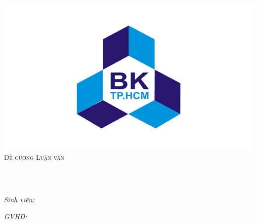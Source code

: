 \documentclass[
11pt, %
vietnam, %
singlespacing, %
parskip, %
headsepline, %
]{MastersDoctoralThesis} %
\author{Lê Công Huy\\ Nguyễn Hoàng Mẫn Tiến} %
\begin{document}
\frontmatter %

\pagestyle{plain} %


\begin{titlepage}
\begin{center}

{\scshape\Large \univname\par}{\large \deptname}\\%
\includegraphics[scale = 0.3]{logo.png}\\ \vspace{1.5cm}	%
\textsc{\LARGE Đề cương Luận văn}\\[0.5cm] %

\hrulefill \\[0.4cm] %
{\huge \bfseries \ttitle\par}\vspace{0.4cm} %
\hrulefill \\[1.5cm] %
 
\begin{minipage}[t]{0.4\textwidth}
\begin{flushleft} \large
\emph{Sinh viên:}\\
\href{http://www.johnsmith.com}{\authorname} %
\end{flushleft}
\end{minipage}
\begin{minipage}[t]{0.4\textwidth}
\begin{flushright} \large
\emph{GVHD:} \\
\href{http://www.jamessmith.com}{\supname} %
\end{flushright}
\end{minipage}\\[4cm]
 

\end{center}
\end{titlepage}
\end{document}
